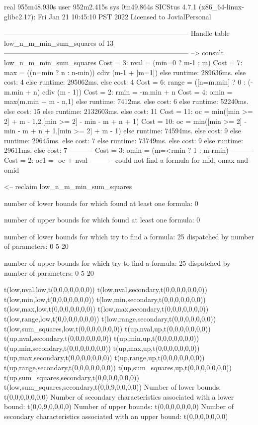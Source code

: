 real	955m48.930s
user	952m2.415s
sys	0m49.864s
SICStus 4.7.1 (x86_64-linux-glibc2.17): Fri Jan 21 10:45:10 PST 2022
Licensed to JovialPersonal


--------------------------------------------------------------------------------
Handle table low_n_m_min_sum_squares of 13
--------------------------------------------------------------------------------
--> consult low_n_m_min_sum_squares
Cost =  3:  nval  = (min=0 ? m-1 : m)
Cost =  7:  max   = ((n=min ? n : n-min)) cdiv (m-1 + [m=1]) %
else runtime: 289636ms. else cost: 4
else runtime: 295062ms. else cost: 4
Cost =  6:  range = ([n=m.min] ? 0 : (-m.min + n) cdiv (m - 1)) %
Cost =  2:  rmin  = -m.min + n
Cost =  4:  omin  = max(m.min + m - n,1)
else runtime: 7412ms. else cost: 6
else runtime: 52240ms. else cost: 15
else runtime: 2132603ms. else cost: 11
Cost = 11:  oc    = min([min >= 2] + m - 1,2.[min >= 2] - min - m + n + 1) %
Cost = 10:  oc    = min([min >= 2] - min - m + n + 1,[min >= 2] + m - 1)
else runtime: 74594ms. else cost: 9
else runtime: 29645ms. else cost: 7
else runtime: 73749ms. else cost: 9
else runtime: 29611ms. else cost: 7
----------
Cost =  3:  omin  = (m=<rmin ? 1 : m-rmin)
----------
Cost =  2:  oc1   = -oc + nval
----------
could not find a formula for mid, omax and omid

<-- reclaim low_n_m_min_sum_squares

number of lower bounds for which found at least one formula: 0

number of upper bounds for which found at least one formula: 0

number of lower bounds for which try to find a formula: 25
dispatched by number of parameters: 0  5  20

number of upper bounds for which try to find a formula: 25
dispatched by number of parameters: 0  5  20

t(low,nval,low,t(0,0,0,0,0,0,0))
t(low,nval,secondary,t(0,0,0,0,0,0,0))
t(low,min,low,t(0,0,0,0,0,0,0))
t(low,min,secondary,t(0,0,0,0,0,0,0))
t(low,max,low,t(0,0,0,0,0,0,0))
t(low,max,secondary,t(0,0,0,0,0,0,0))
t(low,range,low,t(0,0,0,0,0,0,0))
t(low,range,secondary,t(0,0,0,0,0,0,0))
t(low,sum_squares,low,t(0,0,0,0,0,0,0))
t(up,nval,up,t(0,0,0,0,0,0,0))
t(up,nval,secondary,t(0,0,0,0,0,0,0))
t(up,min,up,t(0,0,0,0,0,0,0))
t(up,min,secondary,t(0,0,0,0,0,0,0))
t(up,max,up,t(0,0,0,0,0,0,0))
t(up,max,secondary,t(0,0,0,0,0,0,0))
t(up,range,up,t(0,0,0,0,0,0,0))
t(up,range,secondary,t(0,0,0,0,0,0,0))
t(up,sum_squares,up,t(0,0,0,0,0,0,0))
t(up,sum_squares,secondary,t(0,0,0,0,0,0,0))
t(low,sum_squares,secondary,t(0,0,9,0,0,0,0))
Number of lower bounds:                                             t(0,0,0,0,0,0,0)
Number of secondary characteristics associated with a lower bound:  t(0,0,9,0,0,0,0)
Number of upper bounds:                                             t(0,0,0,0,0,0,0)
Number of secondary characteristics associated with an upper bound: t(0,0,0,0,0,0,0)

